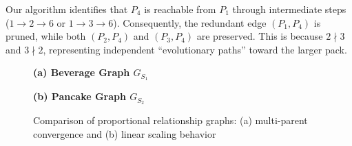 \documentclass[10pt, twocolumn]{article}
\begin{document}
Our algorithm identifies that $P_4$ is reachable from $P_1$ through
intermediate steps ($1 \rightarrow 2 \rightarrow 6$ or $1 \rightarrow 3
    \rightarrow 6$). Consequently, the redundant edge $(P_1, P_4)$ is pruned, while
both $(P_2, P_4)$ and $(P_3, P_4)$ are preserved. This is because $2 \nmid 3$
and $3 \nmid 2$, representing independent ``evolutionary paths'' toward the
larger pack.
\begin{figure}[t]
    \centering

    \begin{minipage}{0.48\textwidth}
        \centering

        \vspace{0.2cm}
        \textbf{(a) Beverage Graph $G_{S_1}$}
    \end{minipage}
    \hfill
    \begin{minipage}{0.48\textwidth}
        \centering

        \vspace{0.2cm}
        \textbf{(b) Pancake Graph $G_{S_2}$}
    \end{minipage}

    \caption{Comparison of proportional relationship graphs: (a) multi-parent
        convergence and (b) linear scaling behavior}
\end{figure}
\end{document}
